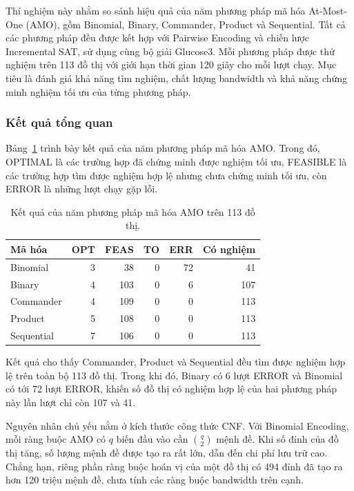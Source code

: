 \documentclass[a4paper,fleqn]{cas-sc}
\begin{document}
Thí nghiệm này nhằm so sánh hiệu quả của năm phương pháp mã hóa At-Most-One (AMO), gồm Binomial, Binary, Commander, Product và Sequential. Tất cả các phương pháp đều được kết hợp với Pairwise Encoding và chiến lược Incremental SAT, sử dụng cùng bộ giải Glucose3. Mỗi phương pháp được thử nghiệm trên 113 đồ thị với giới hạn thời gian 120 giây cho mỗi lượt chạy. Mục tiêu là đánh giá khả năng tìm nghiệm, chất lượng bandwidth và khả năng chứng minh nghiệm tối ưu của từng phương pháp.

\subsubsection{Kết quả tổng quan}

Bảng~\ref{tab:amo-status} trình bày kết quả của năm phương pháp mã hóa AMO. Trong đó, OPTIMAL là các trường hợp đã chứng minh được nghiệm tối ưu, FEASIBLE là các trường hợp tìm được nghiệm hợp lệ nhưng chưa chứng minh tối ưu, còn ERROR là những lượt chạy gặp lỗi.

\begin{table}[pos=H]
\centering
\caption{Kết quả của năm phương pháp mã hóa AMO trên 113 đồ thị.}
\label{tab:amo-status}
\small
\begin{tabular}{lrrrrr}
\toprule
\textbf{Mã hóa} & \textbf{OPT} & \textbf{FEAS} & \textbf{TO} & \textbf{ERR} & \textbf{Có nghiệm} \\
\midrule
Binomial & 3 & 38 & 0 & 72 & 41 \\
Binary & 4 & 103 & 0 & 6 & 107 \\
Commander & 4 & 109 & 0 & 0 & 113 \\
Product & 5 & 108 & 0 & 0 & 113 \\
Sequential & 7 & 106 & 0 & 0 & 113 \\
\bottomrule
\end{tabular}
\end{table}

Kết quả cho thấy Commander, Product và Sequential đều tìm được nghiệm hợp lệ trên toàn bộ 113 đồ thị. Trong khi đó, Binary có 6 lượt ERROR và Binomial có tới 72 lượt ERROR, khiến số đồ thị có nghiệm hợp lệ của hai phương pháp này lần lượt chỉ còn 107 và 41.

Nguyên nhân chủ yếu nằm ở kích thước công thức CNF. Với Binomial Encoding, mỗi ràng buộc AMO có $q$ biến đầu vào cần $\binom{q}{2}$ mệnh đề. Khi số đỉnh của đồ thị tăng, số lượng mệnh đề được tạo ra rất lớn, dẫn đến chi phí lưu trữ cao. Chẳng hạn, riêng phần ràng buộc hoán vị của một đồ thị có 494 đỉnh đã tạo ra hơn 120 triệu mệnh đề, chưa tính các ràng buộc bandwidth trên cạnh.
\end{document}
